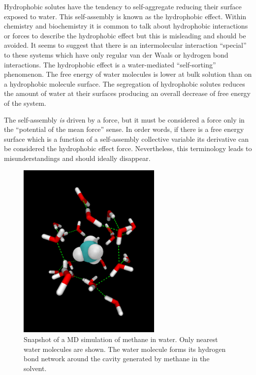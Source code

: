 Hydrophobic solutes have the tendency to self-aggregate reducing their surface exposed to  
water. This self-assembly is known as the hydrophobic effect. Within chemistry and biochemistry it 
is common to talk about hydrophobic interactions or forces to describe the 
hydrophobic effect but this is misleading and should be avoided\cite{Cremer2017}. It seems to 
suggest 
that there is an intermolecular interaction ``special'' to these systems which have only regular 
van der Waals or hydrogen bond interactions. The hydrophobic effect is a water-mediated 
``self-sorting'' phenomenon. The free energy of water molecules is lower at bulk solution than on a 
hydrophobic molecule surface. The segregation of hydrophobic solutes reduces the amount of water at 
their surfaces producing an overall decrease of free energy of the system. 

The self-assembly \textit{is}
driven by a force, but it must be considered a force only in the ``potential of the 
mean force'' sense. In order words, if there 
is a free energy surface which is a function of a self-assembly collective variable its derivative 
can be 
considered the hydrophobic effect force.\cite{Ben-Amotz2016} Nevertheless, this terminology leads 
to misunderstandings and should ideally disappear. 

\begin{figure}
\centering 
\includegraphics[width=7cm]{./images/CH4.png}
\caption[Hydration of ]{Snapshot of a MD
simulation of methane in water. 
Only 
nearest water molecules are shown. The water molecule forms its hydrogen bond network around the 
cavity generated by methane in the solvent. }
\label{CH4}
\end{figure}


